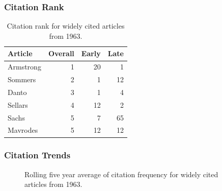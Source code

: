 \documentclass[
  10pt,
  letterpaper,
  DIV=11,
  numbers=noendperiod,
  twoside]{scrartcl}
\begin{document}
\subsubsection*{Citation Rank}\label{sec-rank-1963}

\begin{longtable}[]{@{}lrrr@{}}

\caption{\label{tbl-citation-rank-1963}Citation rank for widely cited
articles from 1963.}

\tabularnewline

\toprule\noalign{}
Article & Overall & Early & Late \\
\midrule\noalign{}
\endhead
\bottomrule\noalign{}
\endlastfoot
Armstrong & 1 & 20 & 1 \\
Sommers & 2 & 1 & 12 \\
Danto & 3 & 1 & 4 \\
Sellars & 4 & 12 & 2 \\
Sachs & 5 & 7 & 65 \\
Mavrodes & 5 & 12 & 12 \\

\end{longtable}

\subsubsection*{Citation Trends}\label{sec-trends-1963}

\begin{figure}


\caption{\label{fig-citation-spaghetti-1963}Rolling five year average of
citation frequency for widely cited articles from 1963.}

\end{figure}%
\end{document}
